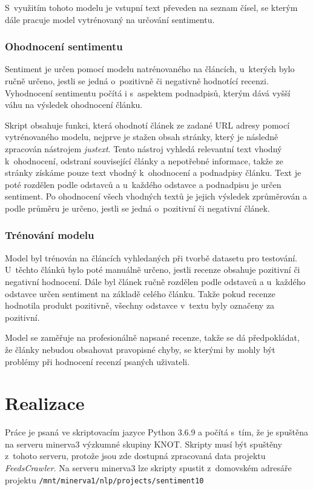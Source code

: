 S~využitím tohoto modelu je vstupní text převeden na seznam čísel, se kterým dále pracuje model vytrénovaný na určování sentimentu.

\subsection*{Ohodnocení sentimentu}
Sentiment je určen pomocí modelu natrénovaného na článcích, u~kterých bylo ručně určeno, jestli se jedná o~pozitivně či negativně hodnotící recenzi. Vyhodnocení sentimentu počítá i s~aspektem podnadpisů, kterým dává vyšší váhu na výsledek ohodnocení článku.

Skript obsahuje funkci, která ohodnotí článek ze zadané URL adresy pomocí vytrénovaného modelu,  nejprve je stažen obsah stránky, který je následně zpracován nástrojem \textit{justext}. Tento nástroj vyhledá relevantní text vhodný k~ohodnocení, odstraní související články a nepotřebné informace, takže ze stránky získáme pouze text vhodný k~ohodnocení a podnadpisy článku. Text je poté rozdělen podle odstavců a u~každého odstavce a podnadpisu je určen sentiment. Po ohodnocení všech vhodných textů je jejich výsledek zprůměrován a podle průměru je určeno, jestli se jedná o~pozitivní či negativní článek.

\subsection*{Trénování modelu}

Model byl trénován na článcích vyhledaných při tvorbě datasetu pro testování. U~těchto článků bylo poté manuálně určeno, jestli recenze obsahuje pozitivní či negativní hodnocení. Dále byl článek ručně rozdělen podle odstavců a u~každého odstavce určen sentiment na základě celého článku. Takže pokud recenze hodnotila produkt pozitivně, všechny odstavce v~textu byly označeny za pozitivní.

Model se zaměřuje na profesionálně napsané recenze, takže se dá předpokládat, že články nebudou obsahovat pravopisné chyby, se kterými by mohly být problémy při hodnocení recenzí psaných uživateli.

\chapter{Realizace}
\label{realizace}

Práce je psaná ve skriptovacím jazyce Python 3.6.9 a počítá s~tím, že je spuštěna na serveru minerva3 výzkumné skupiny KNOT. Skripty musí být spuštěny z~tohoto serveru, protože jsou zde dostupná zpracovaná data projektu \textit{FeedsCrawler}. Na serveru minerva3 lze skripty spustit z~domovském adresáře projektu \verb|/mnt/minerva1/nlp/projects/sentiment10|


